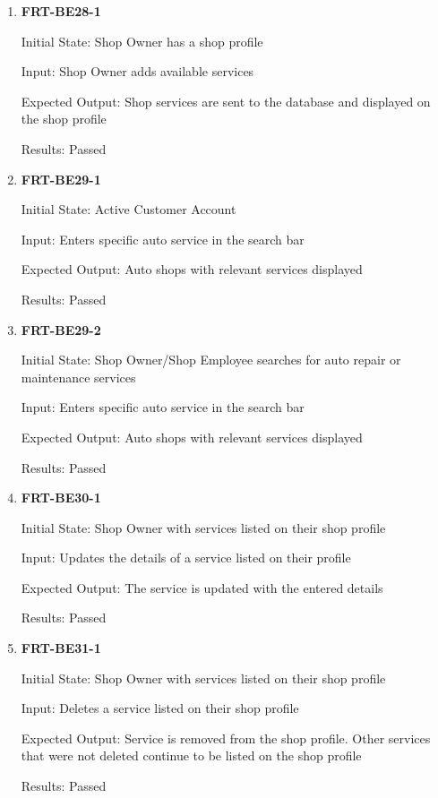 \documentclass[12pt, titlepage]{article}
\begin{document}
\begin{enumerate}

	\item \textbf{FRT-BE28-1}

	      Initial State: Shop Owner has a shop profile

	      Input: Shop Owner adds available services

	      Expected Output: Shop services are sent to the database and displayed on the shop profile

	      Results: Passed

	\item \textbf{FRT-BE29-1}

	      Initial State: Active Customer Account

	      Input: Enters specific auto service in the search bar

	      Expected Output: Auto shops with relevant services displayed

	      Results: Passed

	\item \textbf{FRT-BE29-2}

	      Initial State: Shop Owner/Shop Employee searches for auto repair or maintenance services

	      Input: Enters specific auto service in the search bar

	      Expected Output: Auto shops with relevant services displayed

	      Results: Passed

	\item \textbf{FRT-BE30-1}

	      Initial State: Shop Owner with services listed on their shop profile

	      Input: Updates the details of a service listed on their profile

	      Expected Output: The service is updated with the entered details

	      Results: Passed

	\item \textbf{FRT-BE31-1}

	      Initial State: Shop Owner with services listed on their shop profile

	      Input: Deletes a service listed on their shop profile

	      Expected Output: Service is removed from the shop profile. Other services that were not deleted
	      continue to be listed on the shop profile

	      Results: Passed

\end{enumerate}
\end{document}

